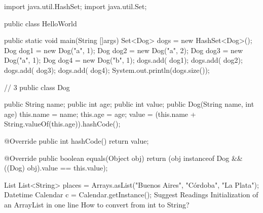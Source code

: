import java.util.HashSet;
import java.util.Set;

public class HelloWorld{

     public static void main(String []args){
         Set<Dog> dogs = new  HashSet<Dog>();
         Dog dog1 = new Dog("a", 1);
         Dog dog2 = new Dog("a", 2);
         Dog dog3 = new Dog("a", 1);
         Dog dog4 = new Dog("b", 1);
         dogs.add( dog1);
         dogs.add( dog2);
         dogs.add( dog3);
         dogs.add( dog4);
        System.out.println(dogs.size());
     }
}


// 3
public class Dog {
    public String name;
    public int age;
    public int value;
    public Dog(String name, int age){
        this.name = name;
        this.age = age;
        value = (this.name + String.valueOf(this.age)).hashCode();
    }

    @Override
    public int hashCode() {
        return value;
    }

    @Override
    public boolean equals(Object obj) {
        return (obj instanceof Dog && ((Dog) obj).value == this.value);
    }
}
List
List<String> places = Arrays.asList("Buenos Aires", "Córdoba", "La Plata");
Datetime
Calendar c = Calendar.getInstance();
Suggest Readings
Initialization of an ArrayList in one line
How to convert from int to String?